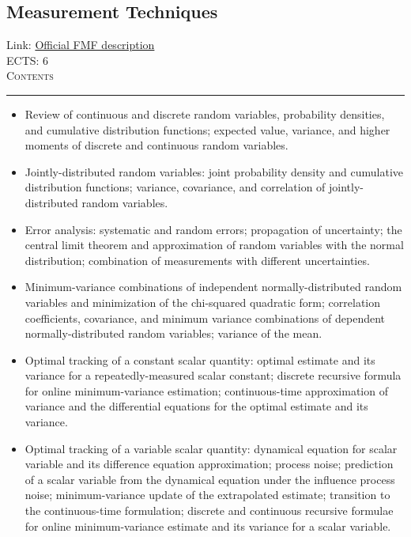 \documentclass[11pt, a4paper]{article}
\newenvironment{course}[3]{
\subsection{#1}%
Link: \href{#2}{Official FMF description}\\%
ECTS: #3%
\vspace{1ex}
\\
{\large \textsc{Contents}}\\[-0.9ex]%
\rule{\textwidth}{0.5pt}
\vspace{-3ex}
}
{}
\newenvironment{chapter}[1]{
\begin{tcolorbox}[title=#1, breakable]
}
{\end{tcolorbox}}
\begin{document}
\begin{course}{Measurement Techniques}{https://www.fmf.uni-lj.si/en/study-physics/programmes/1fiz/2020/7000777/courses/1441/}{6}
    \label{measurement_techniques}

    \begin{chapter}{Error analysis and optimal combination}
        \begin{itemize}
        
            \item Review of continuous and discrete random variables, probability densities, and cumulative distribution functions; expected value, variance, and higher moments of discrete and continuous random variables.

            \item Jointly-distributed random variables: joint probability density and cumulative distribution functions; variance, covariance, and correlation of jointly-distributed random variables.

            \item Error analysis: systematic and random errors; propagation of uncertainty; the central limit theorem and approximation of random variables with the normal distribution; combination of measurements with different uncertainties.

            \item Minimum-variance combinations of independent normally-distributed random variables and minimization of the chi-squared quadratic form; correlation coefficients, covariance, and minimum variance combinations of dependent normally-distributed random variables; variance of the mean.

        \end{itemize}
    \end{chapter}

    \begin{chapter}{The Kalman filter}
        \begin{itemize}
        
            \item Optimal tracking of a constant scalar quantity: optimal estimate and its variance for a repeatedly-measured scalar constant; discrete recursive formula for online minimum-variance estimation; continuous-time approximation of variance and the differential equations for the optimal estimate and its variance.

            \item Optimal tracking of a variable scalar quantity: dynamical equation for scalar variable and its difference equation approximation; process noise; prediction of a scalar variable from the dynamical equation under the influence process noise; minimum-variance update of the extrapolated estimate; transition to the continuous-time formulation; discrete and continuous recursive formulae for online minimum-variance estimate and its variance for a scalar variable.


\end{itemize}
\end{chapter}
\end{course}
\end{document}
